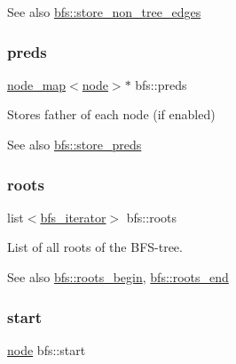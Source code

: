\begin{DoxySeeAlso}{See also}
\mbox{\hyperlink{classbfs_afed1aa751dbea4b6fb9dbdcea24b04f2}{bfs\+::store\+\_\+non\+\_\+tree\+\_\+edges}} 
\end{DoxySeeAlso}
\mbox{\label{classbfs_a3bac5ed333bb78a30a67099c3b94aa0c}} 
\subsubsection{\texorpdfstring{preds}{preds}}
{\footnotesize\ttfamily \mbox{\hyperlink{classnode__map}{node\+\_\+map}}$<$\mbox{\hyperlink{classnode}{node}}$>$$\ast$ bfs\+::preds\hspace{0.3cm}{\ttfamily [protected]}}



Stores father of each node (if enabled) 

\begin{DoxySeeAlso}{See also}
\mbox{\hyperlink{classbfs_aa7200a3b11a17b8c87675b1a9bc010aa}{bfs\+::store\+\_\+preds}} 
\end{DoxySeeAlso}
\mbox{\label{classbfs_a79d19028002766f7992fe94689217f99}} 
\subsubsection{\texorpdfstring{roots}{roots}}
{\footnotesize\ttfamily list$<$\mbox{\hyperlink{classbfs_acafce54954100cc7bc9f80eb318a7bee}{bfs\+\_\+iterator}}$>$ bfs\+::roots\hspace{0.3cm}{\ttfamily [protected]}}



List of all roots of the B\+F\+S-\/tree. 

\begin{DoxySeeAlso}{See also}
\mbox{\hyperlink{classbfs_a8ba1e13916302d68faafc5c5098b04fe}{bfs\+::roots\+\_\+begin}}, \mbox{\hyperlink{classbfs_ab120a4a529a9cbf407e5dcba8d33598e}{bfs\+::roots\+\_\+end}} 
\end{DoxySeeAlso}
\mbox{\label{classbfs_af2ab561d9e60a9fc2e25b02d1f807f96}} 
\subsubsection{\texorpdfstring{start}{start}}
{\footnotesize\ttfamily \mbox{\hyperlink{classnode}{node}} bfs\+::start\hspace{0.3cm}{\ttfamily [protected]}}



